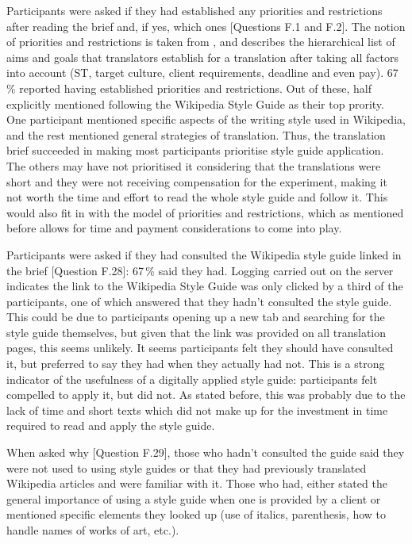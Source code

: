 \noindent Participants were asked if they had established any priorities and restrictions after reading the brief and, if yes, which ones [Questions F.1 and F.2]. The notion of priorities and restrictions is taken from \textcite{zabalbeascoa1999priorities}, and describes the hierarchical list of aims and goals that translators establish for a translation after taking all factors into account (\ac{ST}, target culture, client requirements, deadline and even pay). 67\,\% reported having established priorities and restrictions. Out of these, half explicitly mentioned following the Wikipedia Style Guide as their top prority. One participant mentioned specific aspects of the writing style used in Wikipedia, and the rest mentioned general strategies of translation. Thus, the translation brief succeeded in making most participants prioritise style guide application. The others may have not prioritised it considering that the translations were short and they were not receiving compensation for the experiment, making it not worth the time and effort to read the whole style guide and follow it. This would also fit in with the model of priorities and restrictions, which as mentioned before allows for time and payment considerations to come into play.

Participants were asked if they had consulted the Wikipedia style guide linked in the brief [Question F.28]: 67\,\% said they had. Logging carried out on the server indicates the link to the Wikipedia Style Guide was only clicked by a third of the participants, one of which answered that they hadn't consulted the style guide. This could be due to participants opening up a new tab and searching for the style guide themselves, but given that the link was provided on all translation pages, this seems unlikely. It seems participants felt they should have consulted it, but preferred to say they had when they actually had not. This is a strong indicator of the usefulness of a digitally applied style guide: participants felt compelled to apply it, but did not. As stated before, this was probably due to the lack of time and short texts which did not make up for the investment in time required to read and apply the style guide.

When asked why [Question F.29], those who hadn't consulted the guide said they were not used to using style guides or that they had previously translated Wikipedia articles and were familiar with it. Those who had, either stated the general importance of using a style guide when one is provided by a client or mentioned specific elements they looked up (use of italics, parenthesis, how to handle names of works of art, etc.).

